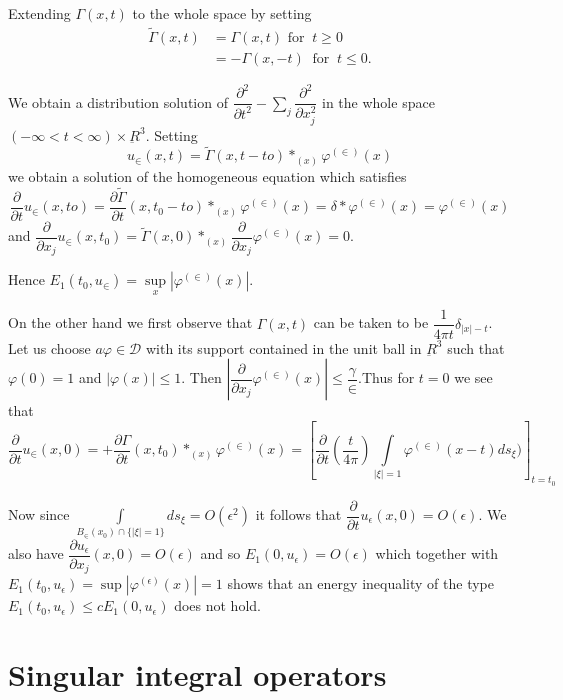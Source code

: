  Extending $\Gamma (x, t)$ to the whole space by setting 
 \begin{align*}
\tilde{\Gamma} (x, t) & = \Gamma (x, t) \text{ for } ~ t \geq 0\\ 
&= - \Gamma (x,-t) ~\text{ for } ~ t \leq 0.
 \end{align*} 

 We obtain a distribution solution of $\dfrac{\partial^2}{\partial
   t^2} - \sum\limits_{j} \dfrac{\partial^2}{\partial x^2_j}$ in the
 whole space $(-\infty < t < \infty)\times \underbar{R}^3$. Setting 
 $$
 u_\in (x, t) = \tilde{\Gamma} (x, t-to) *_{(x)} \varphi^{(\in)} (x) 
 $$
 we obtain a solution of the homogeneous equation which satisfies 
 $$
 \frac{\partial}{\partial t} u_\in (x, to) = \frac{\partial
   \tilde{\Gamma}}{\partial t} (x, t_0 -to) *_{(x)} \varphi^{(\in)} (x)=
 \delta * \varphi^{(\in)} (x) = \varphi^{(\in)} (x) 
 $$
 and $\dfrac{\partial}{\partial x_j} u_\in (x,t_0) = \tilde{\Gamma}
 (x, 0) *_{(x)} \dfrac{\partial}{\partial x_j} \varphi^{(\in)} (x) =
 0$. 
 
Hence $E_1 (t_0, u_\in) = \sup\limits_{x} |\varphi^{(\in)} (x)|$.

On the other hand we first observe that $\Gamma (x, t)$ can be taken
to be $\dfrac{1}{4 \pi t} \delta_{|x|-t}$. Let us choose $a \varphi
\in \mathscr{D}$ with its support contained in the unit ball in
$\underbar{R}^3$ such that $\varphi (0) = 1$ and $|\varphi (x)| \leq
1$. Then $|\dfrac{\partial}{\partial x_j} \varphi^{(\in)} (x) | \leq
\dfrac{\gamma}{\in}$.\pageoriginale Thus for $t = 0$ we see that  
$$
\frac{\partial}{\partial t} u_\in (x, 0) = + \frac{\partial
  \Gamma}{\partial t} (x, t_0) *_{(x)} \varphi^{(\in)} (x) = \left[
  \frac{\partial}{\partial t} (\frac{t}{4 \pi}) \int\limits_{|\xi|=1}
  \varphi^{(\in)} (x-t) ds_\xi ) \right]_{t=t_0} 
$$

Now since $\int\limits_{B_\in (x_0) \cap \{| \xi | =1 \}} ds_\xi =
O(\epsilon^2)$ it follows that $\dfrac{\partial}{\partial t} u_\epsilon (x, 0) =
O(\epsilon)$. We also have $\dfrac{\partial u_\epsilon}{\partial x_j} (x, 0) = O
(\epsilon)$ and so $E_1 (0, u_\epsilon) = O(\epsilon)$ which together
with $E_1 (t_0, u_{\epsilon}) = \sup | \varphi^{(\epsilon)}(x)| =1$ shows
that an energy inequality 
of the type $E_1 (t_0, u_{\epsilon}) \leq cE_1(0, u_{\epsilon})$ does not hold. 


\section{Singular integral operators}\label{chap3-sec3}%

